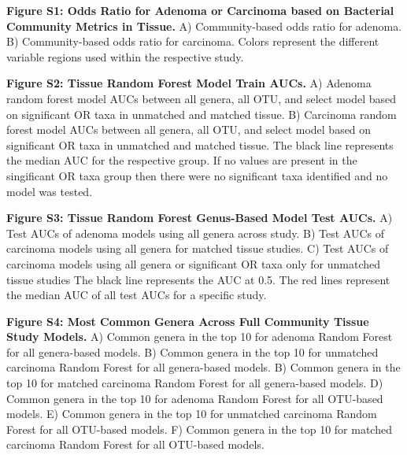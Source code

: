 \documentclass[12pt,]{article}
\begin{document}
\newpage

\textbf{Figure S1: Odds Ratio for Adenoma or Carcinoma based on
Bacterial Community Metrics in Tissue.} A) Community-based odds ratio
for adenoma. B) Community-based odds ratio for carcinoma. Colors
represent the different variable regions used within the respective
study.

\textbf{Figure S2: Tissue Random Forest Model Train AUCs.} A) Adenoma
random forest model AUCs between all genera, all OTU, and select model
based on significant OR taxa in unmatched and matched tissue. B)
Carcinoma random forest model AUCs between all genera, all OTU, and
select model based on significant OR taxa in unmatched and matched
tissue. The black line represents the median AUC for the respective
group. If no values are present in the singificant OR taxa group then
there were no significant taxa identified and no model was tested.

\textbf{Figure S3: Tissue Random Forest Genus-Based Model Test AUCs.} A)
Test AUCs of adenoma models using all genera across study. B) Test AUCs
of carcinoma models using all genera for matched tissue studies. C) Test
AUCs of carcinoma models using all genera or significant OR taxa only
for unmatched tissue studies The black line represents the AUC at 0.5.
The red lines represent the median AUC of all test AUCs for a specific
study.

\textbf{Figure S4: Most Common Genera Across Full Community Tissue Study
Models.} A) Common genera in the top 10 for adenoma Random Forest for
all genera-based models. B) Common genera in the top 10 for unmatched
carcinoma Random Forest for all genera-based models. B) Common genera in
the top 10 for matched carcinoma Random Forest for all genera-based
models. D) Common genera in the top 10 for adenoma Random Forest for all
OTU-based models. E) Common genera in the top 10 for unmatched carcinoma
Random Forest for all OTU-based models. F) Common genera in the top 10
for matched carcinoma Random Forest for all OTU-based models.

\newpage
\end{document}
